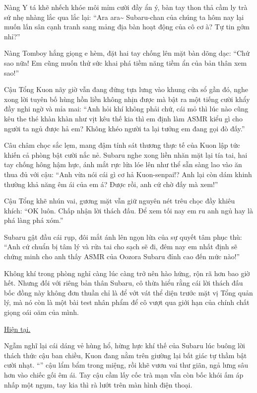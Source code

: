 \documentclass[../main.tex]{subfiles}
\begin{document}
Nàng Y tá khẽ nhếch khóe môi mỉm cười đầy ẩn ý, bàn tay thon thả cầm ly trà sứ nhẹ nhàng lắc qua lắc lại: ``Ara ara\~{} Subaru-chan của chúng ta hôm nay lại muốn lấn sân cạnh tranh sang mảng địa bàn hoạt động của cô cơ à? Tự tin gớm nhỉ?''

Nàng Tomboy hắng giọng e hèm, đặt hai tay chống lên mặt bàn dõng dạc: ``Chứ sao nữa! Em cũng muốn thử sức khai phá tiềm năng tiềm ẩn của bản thân xem sao!''

Cậu Tổng Kuon nãy giờ vẫn đang đứng tựa lưng vào khung cửa sổ gần đó, nghe xong lời tuyên bố hùng hồn liền không nhịn được mà bật ra một tiếng cười khẩy đầy nghi ngờ và mỉa mai: ``Anh hỏi khí không phải chứ, cái mỏ thì lúc nào cũng kêu the thé khàn khàn như vịt kêu thế kia thì em định làm ASMR kiểu gì cho người ta ngủ được hả em? Không khéo người ta lại tưởng em đang gọi đò đấy.''

Câu châm chọc sắc lẹm, mang đậm tính sát thương thực tế của Kuon lập tức khiến cả phòng bật cười nắc nẻ. Subaru nghe xong liền nhăn mặt lại tía tai, hai tay chống hông hậm hực, ánh mắt rực lửa lóe lên như thể sẵn sàng lao vào ăn thua đủ với cậu: ``Anh vừa nói cái gì cơ hả Kuon-senpai!? Anh lại còn dám khinh thường khả năng êm ái của em á? Được rồi, anh cứ chờ đấy mà xem!''

Cậu Tổng khẽ nhún vai, gương mặt vẫn giữ nguyên nét trêu chọc đầy khiêu khích: ``OK luôn. Chấp nhận lời thách đấu. Để xem tối nay em ru anh ngủ hay là phá làng phá xóm.''

Subaru gật đầu cái rụp, đôi mắt ánh lên ngọn lửa của sự quyết tâm phục thù: ``Anh cứ chuẩn bị tâm lý và rửa tai cho sạch sẽ đi, đêm nay em nhất định sẽ chứng minh cho anh thấy ASMR của Oozora Subaru đỉnh cao đến mức nào!''

Không khí trong phòng nghỉ càng lúc càng trở nên hào hứng, rộn rã hơn bao giờ hết. Nhưng đối với riêng bản thân Subaru, cô thừa hiểu rằng cái lời thách đấu bốc đồng này không đơn thuần chỉ là để vớt vát thể diện trước mặt vị Tổng quản lý, mà nó còn là một bài test nhân phẩm để cô vượt qua giới hạn của chính chất giọng oái oăm của mình.

\begin{center}
  \uline{Hiện tại.}
\end{center}

Ngẫm nghĩ lại cái dáng vẻ hùng hổ, hừng hực khí thế của Subaru lúc buông lời thách thức cậu ban chiều, Kuon đang nằm trên giường lại bất giác tự thầm bật cười nhạt. ``'' cậu lẩm bẩm trong miệng, rồi khẽ vươn vai thư giãn, ngả lưng sâu hơn vào chiếc gối êm ái. Tay cậu cầm lấy cốc trà mạn vẫn còn bốc khói ấm áp nhấp một ngụm, tay kia thì rà lướt trên màn hình điện thoại.
\end{document}

